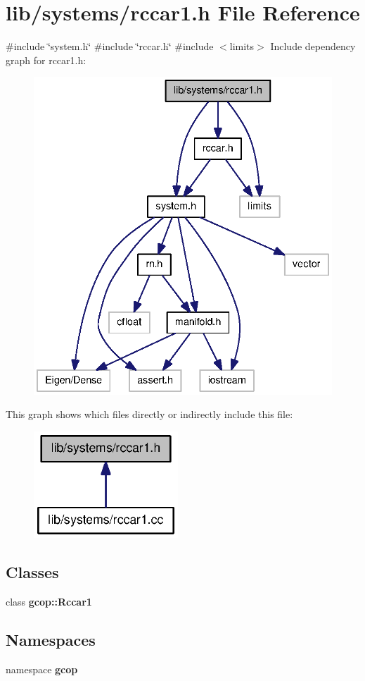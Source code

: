 \section{lib/systems/rccar1.h \-File \-Reference}
\label{rccar1_8h}
{\ttfamily \#include \char`\"{}system.\-h\char`\"{}}\*
{\ttfamily \#include \char`\"{}rccar.\-h\char`\"{}}\*
{\ttfamily \#include $<$limits$>$}\*
\-Include dependency graph for rccar1.\-h\-:
\nopagebreak
\begin{figure}[H]
\begin{center}
\leavevmode
\includegraphics[width=336pt]{rccar1_8h__incl}
\end{center}
\end{figure}
\-This graph shows which files directly or indirectly include this file\-:
\nopagebreak
\begin{figure}[H]
\begin{center}
\leavevmode
\includegraphics[width=154pt]{rccar1_8h__dep__incl}
\end{center}
\end{figure}
\subsection*{\-Classes}
\begin{DoxyCompactItemize}
\item 
class {\bf gcop\-::\-Rccar1}
\end{DoxyCompactItemize}
\subsection*{\-Namespaces}
\begin{DoxyCompactItemize}
\item 
namespace {\bf gcop}
\end{DoxyCompactItemize}
